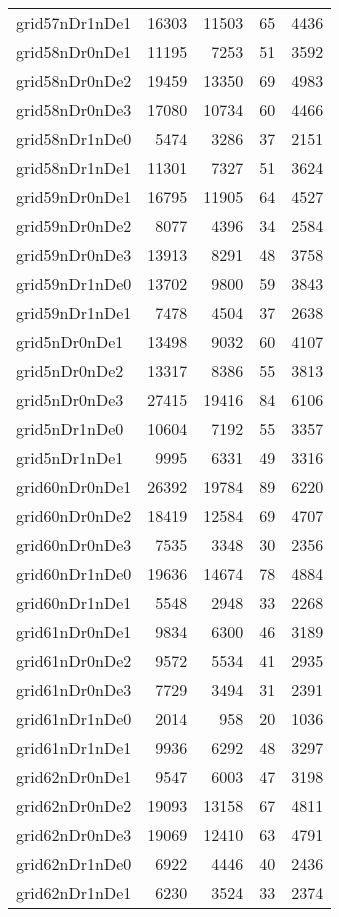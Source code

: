 \begin{longtable}{lrrrr}
grid57nDr1nDe1 & 16303 & 11503 & 65 & 4436 \\
grid58nDr0nDe1 & 11195 & 7253 & 51 & 3592 \\
grid58nDr0nDe2 & 19459 & 13350 & 69 & 4983 \\
grid58nDr0nDe3 & 17080 & 10734 & 60 & 4466 \\
grid58nDr1nDe0 & 5474 & 3286 & 37 & 2151 \\
grid58nDr1nDe1 & 11301 & 7327 & 51 & 3624 \\
grid59nDr0nDe1 & 16795 & 11905 & 64 & 4527 \\
grid59nDr0nDe2 & 8077 & 4396 & 34 & 2584 \\
grid59nDr0nDe3 & 13913 & 8291 & 48 & 3758 \\
grid59nDr1nDe0 & 13702 & 9800 & 59 & 3843 \\
grid59nDr1nDe1 & 7478 & 4504 & 37 & 2638 \\
grid5nDr0nDe1 & 13498 & 9032 & 60 & 4107 \\
grid5nDr0nDe2 & 13317 & 8386 & 55 & 3813 \\
grid5nDr0nDe3 & 27415 & 19416 & 84 & 6106 \\
grid5nDr1nDe0 & 10604 & 7192 & 55 & 3357 \\
grid5nDr1nDe1 & 9995 & 6331 & 49 & 3316 \\
grid60nDr0nDe1 & 26392 & 19784 & 89 & 6220 \\
grid60nDr0nDe2 & 18419 & 12584 & 69 & 4707 \\
grid60nDr0nDe3 & 7535 & 3348 & 30 & 2356 \\
grid60nDr1nDe0 & 19636 & 14674 & 78 & 4884 \\
grid60nDr1nDe1 & 5548 & 2948 & 33 & 2268 \\
grid61nDr0nDe1 & 9834 & 6300 & 46 & 3189 \\
grid61nDr0nDe2 & 9572 & 5534 & 41 & 2935 \\
grid61nDr0nDe3 & 7729 & 3494 & 31 & 2391 \\
grid61nDr1nDe0 & 2014 & 958 & 20 & 1036 \\
grid61nDr1nDe1 & 9936 & 6292 & 48 & 3297 \\
grid62nDr0nDe1 & 9547 & 6003 & 47 & 3198 \\
grid62nDr0nDe2 & 19093 & 13158 & 67 & 4811 \\
grid62nDr0nDe3 & 19069 & 12410 & 63 & 4791 \\
grid62nDr1nDe0 & 6922 & 4446 & 40 & 2436 \\
grid62nDr1nDe1 & 6230 & 3524 & 33 & 2374 \\

\end{longtable}
